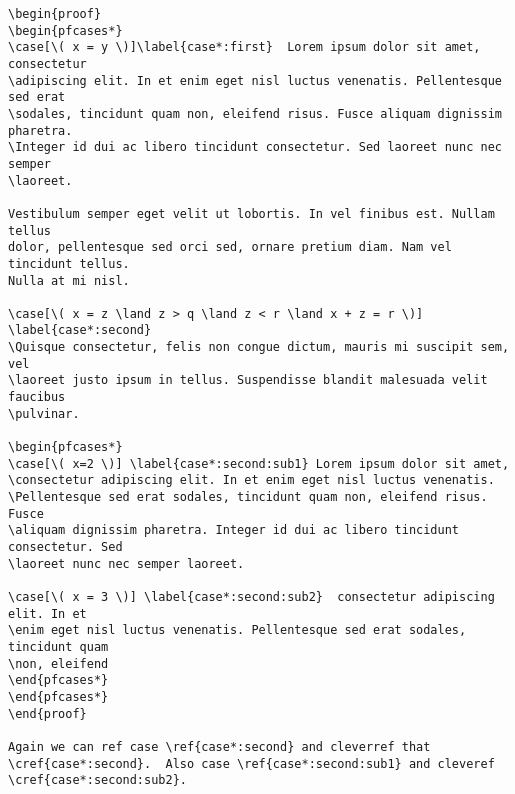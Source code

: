 \documentclass[leqno,11pt]{amsart}
\begin{document}
\begin{verbatim}
\begin{proof}
\begin{pfcases*}
\case[\( x = y \)]\label{case*:first}  Lorem ipsum dolor sit amet, consectetur
\adipiscing elit. In et enim eget nisl luctus venenatis. Pellentesque sed erat
\sodales, tincidunt quam non, eleifend risus. Fusce aliquam dignissim pharetra.
\Integer id dui ac libero tincidunt consectetur. Sed laoreet nunc nec semper
\laoreet. 

Vestibulum semper eget velit ut lobortis. In vel finibus est. Nullam tellus
dolor, pellentesque sed orci sed, ornare pretium diam. Nam vel tincidunt tellus.
Nulla at mi nisl. 

\case[\( x = z \land z > q \land z < r \land x + z = r \)] \label{case*:second}
\Quisque consectetur, felis non congue dictum, mauris mi suscipit sem, vel
\laoreet justo ipsum in tellus. Suspendisse blandit malesuada velit faucibus
\pulvinar. 

\begin{pfcases*}
\case[\( x=2 \)] \label{case*:second:sub1} Lorem ipsum dolor sit amet,
\consectetur adipiscing elit. In et enim eget nisl luctus venenatis.
\Pellentesque sed erat sodales, tincidunt quam non, eleifend risus. Fusce
\aliquam dignissim pharetra. Integer id dui ac libero tincidunt consectetur. Sed
\laoreet nunc nec semper laoreet. 

\case[\( x = 3 \)] \label{case*:second:sub2}  consectetur adipiscing elit. In et
\enim eget nisl luctus venenatis. Pellentesque sed erat sodales, tincidunt quam
\non, eleifend 
\end{pfcases*}
\end{pfcases*}
\end{proof}

Again we can ref case \ref{case*:second} and cleverref that \cref{case*:second}.  Also case \ref{case*:second:sub1} and cleveref \cref{case*:second:sub2}.
\end{verbatim}
\end{document}
